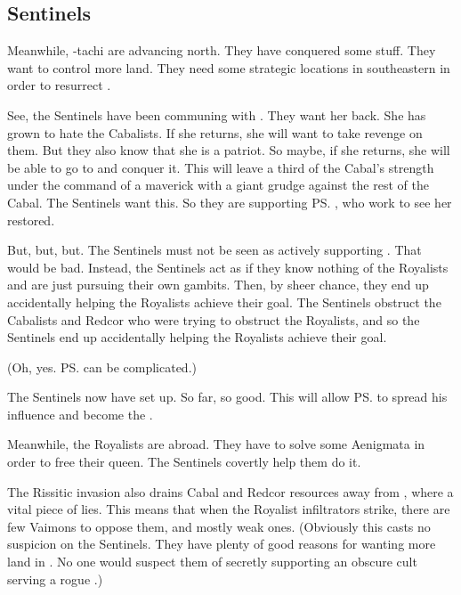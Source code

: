 \subsection{Sentinels}
Meanwhile, \Narkiza-tachi are advancing north. 
They have conquered some stuff. 
They want to control more land. 
They need some strategic locations in southeastern \Velcad{} in order to resurrect \Belzir. 

See, the Sentinels have been communing with \Belzir. 
They want her back. 
She has grown to hate the Cabalists.
If she returns, she will want to take revenge on them. 
But they also know that she is a \Mystraacht{} patriot. 
So maybe, if she returns, she will be able to go to \Mystraacht{} and conquer it. 
This will leave a third of the Cabal's strength under the command of a maverick with a giant grudge against the rest of the Cabal. 
The Sentinels want this. 
So they are supporting \ps{\Belzir} , who work to see her restored. 

But, but, but. 
The Sentinels must not be seen as actively supporting \Belzir.
That would be bad. 
Instead, the Sentinels act as if they know nothing of the Royalists and are just pursuing their own gambits.
Then, by sheer chance, they  end up accidentally helping the Royalists achieve their goal. 
The Sentinels obstruct the Cabalists and Redcor who were trying to obstruct the Royalists, and so the Sentinels  end up accidentally helping the Royalists achieve their goal. 

(Oh, yes. 
\ps{\Secherdamon}  can be complicated.) 

The Sentinels now have \Nithdornazsh{} set up. 
So far, so good. 
This will allow \ps{\Vizsherioch} to spread his \vertex{} influence and become the . 

Meanwhile, the Royalists are abroad. 
They have to solve some Aenigmata in order to free their queen. 
The Sentinels covertly help them do it. 

The Rissitic invasion also drains Cabal and Redcor resources away from \Redce, where a vital piece of \Belzir{} lies. 
This means that when the \Redcean{} Royalist infiltrators strike, there are few Vaimons to oppose them, and mostly weak ones. 
(Obviously this casts no suspicion on the Sentinels. 
 They have plenty of good reasons for wanting more land in \Velcad.
 No one would suspect them of secretly supporting an obscure cult serving a rogue \resphan.) 





